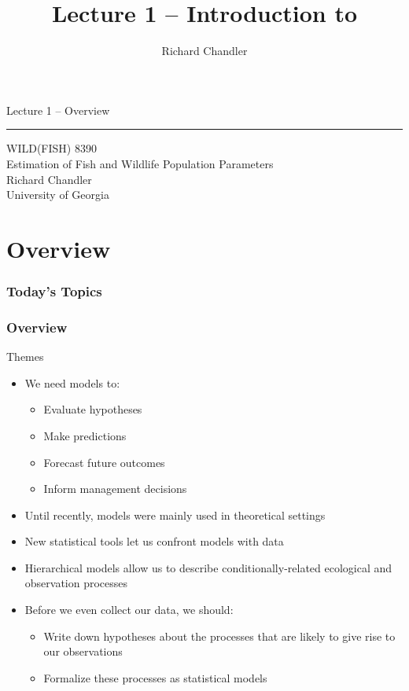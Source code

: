 \documentclass[color=usenames,dvipsnames]{beamer}\usepackage[]{graphicx}\usepackage[]{color}
\title{Lecture 1 -- Introduction to }
\author{Richard Chandler}
\begin{document}
\begin{frame}[plain]
  \LARGE
  \centering
  {\huge %
    Lecture 1 -- Overview} \\
  {\color{default} \rule{\textwidth}{0.1pt}}
  \vfill
  \large
  WILD(FISH) 8390 \\
  Estimation of Fish and Wildlife Population Parameters \\
  \vfill
  Richard Chandler \\
  University of Georgia
\end{frame}



\section{Overview}


\begin{frame}[plain]
  \frametitle{Today's Topics}
  \Large
\end{frame}



\begin{frame}[fragile]
  \frametitle{Overview}
  {\Large Themes}
  \begin{itemize}
    \item<1-> We need models to:
      \begin{itemize}[<1->]
        \item Evaluate hypotheses
        \item Make predictions
        \item Forecast future outcomes
        \item Inform management decisions
      \end{itemize}
    \item<2-> Until recently, models were mainly used in theoretical settings
    \item<3-> New statistical tools let us confront models with data
    \item<4-> Hierarchical models allow us to describe 
      conditionally-related ecological and observation processes
    \item<5-> Before we even collect our data, we should:
      \begin{itemize}
        \item Write down hypotheses about the processes that are likely to give 
          rise to our observations
        \item Formalize these processes as statistical models
      \end{itemize}
  \end{itemize}
\end{frame}
\end{document}
